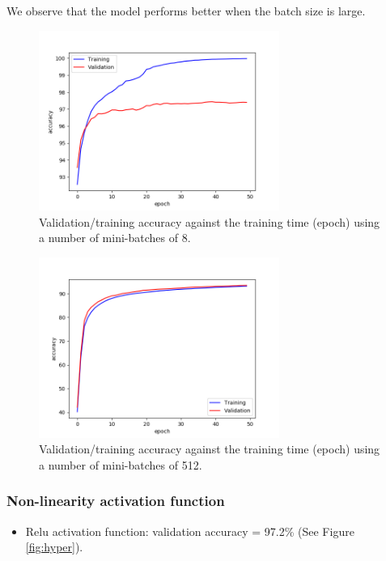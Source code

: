 \documentclass[a4paper]{article}
\begin{document}
\begin{enumerate}
\begin{itemize}
\end{itemize}
We observe that the model performs better when the batch size is large.
\begin{figure}
\centering
\includegraphics[width=0.7\textwidth]{batch2.png}
\caption{\label{fig:batch2}Validation/training accuracy against the training time (epoch) using a number of mini-batches of 8.}
\end{figure}

\begin{figure}
\centering
\includegraphics[width=0.7\textwidth]{batch3.png}
\caption{\label{fig:batch3}Validation/training accuracy against the training time (epoch) using a number of mini-batches of 512.}
\end{figure}

\subsubsection{Non-linearity activation function}


\begin{itemize}

\item Relu activation function: validation accuracy = 97.2\% (See Figure \ref{fig:hyper}).


\end{itemize}
\end{enumerate}
\end{document}
